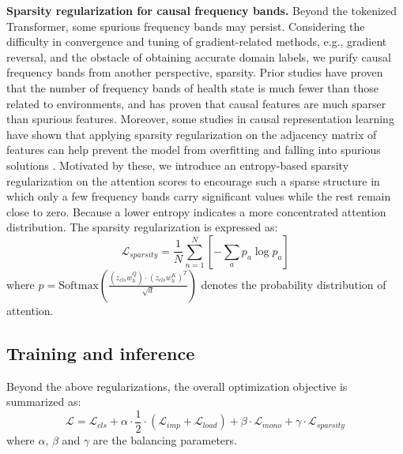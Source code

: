 \documentclass{article}
\begin{document}
	\textbf{Sparsity regularization for causal frequency bands.} Beyond the tokenized Transformer, some spurious frequency bands may persist. Considering the difficulty in convergence and tuning of gradient-related methods, e.g., gradient reversal, and the obstacle of obtaining accurate domain labels, we purify causal frequency bands from another perspective, sparsity. Prior studies \cite{RN6, e20100747} have proven that the number of frequency bands of health state is much fewer than those related to environments, and \cite{RN16} has proven that causal features are much sparser than spurious features. Moreover, some studies in causal representation learning have shown that applying sparsity regularization on the adjacency matrix of features can help prevent the model from overfitting and falling into spurious solutions \cite{RN51}. Motivated by these, we introduce an entropy-based sparsity regularization on the attention scores to encourage such a sparse structure in which only a few frequency bands carry significant values while the rest remain close to zero. Because a lower entropy indicates a more concentrated attention distribution. The sparsity regularization is expressed as:
	\begin{equation}
		\mathcal{L}_{sparsity}=\frac{1}{N}\sum_{n=1}^{N}\left[-\sum_{a}p_{a}\log p_{a}\right]
		\label{loss_sparsity}
	\end{equation}
	where $p=\mathrm{Softmax}\left(\tfrac{\left(z_{cls}w_{h}^{Q}\right)\cdot\left(z_{cls}w_{h}^{K}\right)^{T}}{\sqrt{d}}\right)$ denotes the probability distribution of attention.
	
	\subsection{Training and inference}
	Beyond the above regularizations, the overall optimization objective is summarized as:
	\begin{equation}
		\mathcal{L}=\mathcal{L}_{cls}+\alpha\cdot\frac{1}{2}\cdot\left(\mathcal{L}_{imp}+\mathcal{L}_{load}\right)+\beta\cdot\mathcal{L}_{mono}+\gamma\cdot\mathcal{L}_{sparsity}
		\label{loss}
	\end{equation}
	where $\alpha$, $\beta$ and $\gamma$ are the balancing parameters.
	
\end{document}
